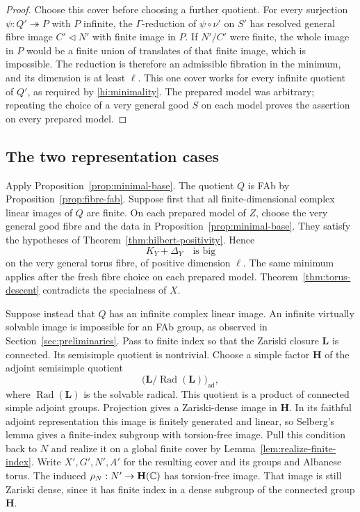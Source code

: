 \begin{proof}
Choose this cover before choosing a further quotient. For every
surjection \(\psi:Q'\twoheadrightarrow P\) with \(P\) infinite,
the \(\Gamma\)-reduction of \(\psi\circ\nu'\) on \(S'\) has
resolved general fibre image \(C'\triangleleft N'\) with finite
image in \(P\). If \(N'/C'\) were finite, the whole image in
\(P\) would be a finite union of translates of that finite image,
which is impossible. The reduction is therefore an admissible
fibration in the minimum, and its dimension is at least \(\ell\).
This one cover works for every infinite quotient of \(Q'\), as
required by \eqref{hi:minimality}. The prepared model was arbitrary;
repeating the choice of a very general good \(S\) on each model
proves the assertion on every prepared model.
\end{proof}

\subsection{The two representation cases}

Apply Proposition~\ref{prop:minimal-base}. The quotient \(Q\)
is FAb by Proposition~\ref{prop:fibre-fab}. Suppose first that
all finite-dimensional complex linear images of \(Q\) are
finite. On each prepared model of \(Z\), choose the very general
good fibre and the data in Proposition~\ref{prop:minimal-base}.
They satisfy the hypotheses of
Theorem~\ref{thm:hilbert-positivity}. Hence
\[
 K_Y+\Delta_Y\quad\text{is big}
\]
on the very general torus fibre, of positive dimension \(\ell\).
The same minimum applies after the fresh fibre choice on each
prepared model. Theorem~\ref{thm:torus-descent} contradicts the
specialness of \(X\).

Suppose instead that \(Q\) has an infinite complex linear image.
An infinite virtually solvable image is impossible for an FAb
group, as observed in Section~\ref{sec:preliminaries}. Pass to
finite index so that the Zariski closure \(\mathbf L\) is connected.
Its semisimple quotient is nontrivial. Choose a simple factor
\(\mathbf H\) of the adjoint semisimple quotient
\[
 \bigl(\mathbf L/\operatorname{Rad}(\mathbf L)\bigr)_{\mathrm{ad}},
\]
where \(\operatorname{Rad}(\mathbf L)\) is the solvable radical.
This quotient is a product of connected simple adjoint groups. Projection
gives a Zariski-dense image in \(\mathbf H\). In its faithful
adjoint representation this image is finitely generated and linear,
so Selberg's lemma \cite{Selberg1960} gives a finite-index subgroup
with torsion-free image. Pull this condition back to \(N\) and
realize it on a global finite cover by
Lemma~\ref{lem:realize-finite-index}. Write \(X',G',N',A'\) for
the resulting cover and its groups and Albanese torus. The induced
\(\rho_N:N'\to\mathbf H(\mathbb C)\) has torsion-free image. That image
is still Zariski dense, since it has finite index in a dense subgroup
of the connected group \(\mathbf H\).

